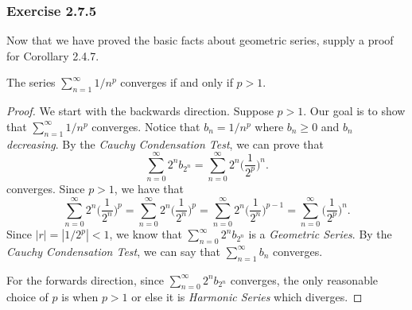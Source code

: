 \subsubsection{Exercise 2.7.5} Now that we have proved the basic facts about geometric series, supply a proof for Corollary 2.4.7.
\begin{tcolorbox}
\begin{cor}
The series \( \sum_{n=1}^{\infty} 1/n^p \) converges if and only if \( p > 1 \).
\end{cor}
\end{tcolorbox}
\begin{proof}
    We start with the backwards direction. Suppose \( p > 1 \). Our goal is to show that \( \sum_{n=1}^{\infty} 1/n^p\) converges. Notice that \( b_n = 1/n^p\) where \( b_n \geq 0 \) and \( b_n \)
\textit{decreasing}. By the \textit{Cauchy Condensation Test}, we can prove that 
\[ \sum_{n=0}^{\infty} 2^n b_{2^n} = \sum_{n=0}^{\infty} 2^n \Big( \frac{1}{2^p}\Big)^n.\]
converges. Since \( p > 1 \), we have that 
\[ \sum_{n=0}^{\infty} 2^n \Big( \frac{1}{2^n}\Big)^p = \sum_{n=0}^{\infty} 2^n \Big( \frac{1}{2^n}\Big)^p = \sum_{n=0}^{\infty} 2^n \Big( \frac{1}{2^n}\Big)^{p-1} = \sum_{n=0}^{\infty} \Big(\frac{1}{2^p} \Big)^n.\]
Since \( |r| = |1/2^p| < 1 \), we know that \( \sum_{n=0}^{\infty}2^n b_{2^n}\) is a \textit{Geometric Series}. By the \textit{Cauchy Condensation Test}, we can say that \( \sum_{n=1}^{\infty} b_n \) converges. 

For the forwards direction, since  \(\sum_{n=0}^{\infty} 2^n b_{2^n}\) converges, the only reasonable choice of \( p \) is when \( p > 1 \) or else it is \textit{Harmonic Series} which diverges.
\end{proof}

